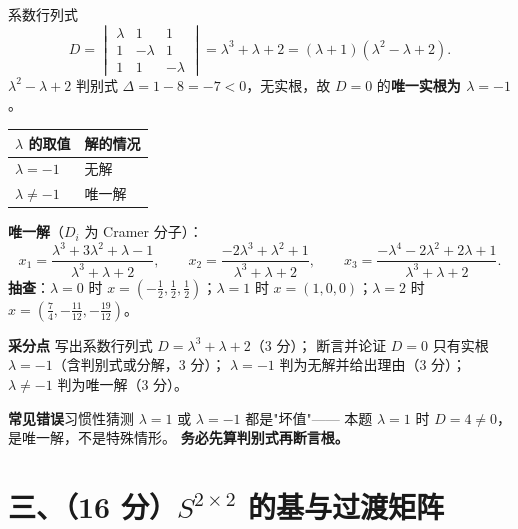 \documentclass[11pt]{ctexart}
\begin{document}
\begin{ansbox}
系数行列式
\[
D=\begin{vmatrix}\lambda&1&1\\1&-\lambda&1\\1&1&-\lambda\end{vmatrix}=\lambda^3+\lambda+2=(\lambda+1)(\lambda^2-\lambda+2).
\]
$\lambda^2-\lambda+2$ 判别式 $\Delta=1-8=-7<0$，无实根，故 $D=0$ 的\textbf{唯一实根为 $\lambda=-1$}。

\begin{center}
\begin{tabular}{@{}ll@{}}
\toprule
$\lambda$ 的取值 & 解的情况\\
\midrule
$\lambda=-1$ & 无解\\
$\lambda\ne-1$ & 唯一解\\
\bottomrule
\end{tabular}
\end{center}

\textbf{唯一解}（$D_i$ 为 Cramer 分子）：
\[
x_1=\frac{\lambda^3+3\lambda^2+\lambda-1}{\lambda^3+\lambda+2},\qquad
x_2=\frac{-2\lambda^3+\lambda^2+1}{\lambda^3+\lambda+2},\qquad
x_3=\frac{-\lambda^4-2\lambda^2+2\lambda+1}{\lambda^3+\lambda+2}.
\]
\textbf{抽查}：$\lambda=0$ 时 $x=(-\tfrac12,\tfrac12,\tfrac12)$；$\lambda=1$ 时 $x=(1,0,0)$；$\lambda=2$ 时 $x=(\tfrac74,-\tfrac{11}{12},-\tfrac{19}{12})$。
\end{ansbox}

\begin{scorebox}
\textbf{采分点}\quad
写出系数行列式 $D=\lambda^3+\lambda+2$（3 分）；
断言并论证 $D=0$ 只有实根 $\lambda=-1$（含判别式或分解，3 分）；
$\lambda=-1$ 判为无解并给出理由（3 分）；
$\lambda\ne-1$ 判为唯一解（3 分）。

\textbf{常见错误}\quad 习惯性猜测 $\lambda=1$ 或 $\lambda=-1$ 都是"坏值"——
本题 $\lambda=1$ 时 $D=4\ne0$，是唯一解，不是特殊情形。
\textbf{务必先算判别式再断言根。}
\end{scorebox}

\section*{三、（16 分）$S^{2\times2}$ 的基与过渡矩阵}
\end{document}

